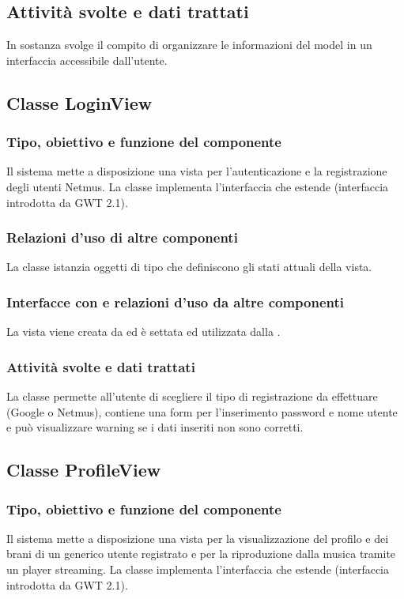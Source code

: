 \subsection*{Attivit\`a svolte e dati trattati}
In sostanza svolge il compito di organizzare le informazioni del model in un
interfaccia accessibile dall'utente.

\subsection{Classe LoginView}
\subsubsection*{Tipo, obiettivo e funzione del componente}
Il sistema mette a disposizione una vista per l'autenticazione e la
registrazione degli utenti Netmus. La classe 
implementa l'interfaccia  che estende 
(interfaccia introdotta da GWT 2.1).
\subsubsection*{Relazioni d'uso di altre componenti}
La classe istanzia oggetti di tipo  che definiscono gli stati
attuali della vista.
\subsubsection*{Interfacce con e relazioni d'uso da altre componenti}
La vista viene creata da  ed \`e settata ed utilizzata dalla
.
\subsubsection*{Attivit\`a svolte e dati trattati}
La classe permette all'utente di scegliere il tipo di registrazione da
effettuare (Google o Netmus), contiene una form per l'inserimento password e
nome utente e pu\`o visualizzare warning se i dati inseriti non sono corretti.

\subsection{Classe ProfileView}
\subsubsection*{Tipo, obiettivo e funzione del componente}
Il sistema mette a disposizione una vista per la visualizzazione del profilo e
dei brani di un generico utente registrato e per la riproduzione dalla musica
tramite un player streaming. La classe  implementa
l'interfaccia  che estende  (interfaccia introdotta
da GWT 2.1).
